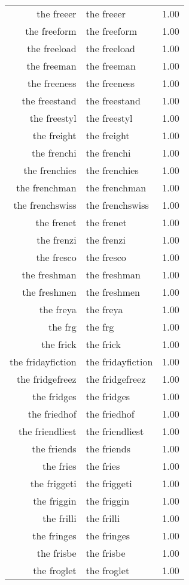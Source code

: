 \begin{table}[ht]
\begin{tabular}{rlr}
  the freeer & the freeer & 1.00 \\ 
  the freeform & the freeform & 1.00 \\ 
  the freeload & the freeload & 1.00 \\ 
  the freeman & the freeman & 1.00 \\ 
  the freeness & the freeness & 1.00 \\ 
  the freestand & the freestand & 1.00 \\ 
  the freestyl & the freestyl & 1.00 \\ 
  the freight & the freight & 1.00 \\ 
  the frenchi & the frenchi & 1.00 \\ 
  the frenchies & the frenchies & 1.00 \\ 
  the frenchman & the frenchman & 1.00 \\ 
  the frenchswiss & the frenchswiss & 1.00 \\ 
  the frenet & the frenet & 1.00 \\ 
  the frenzi & the frenzi & 1.00 \\ 
  the fresco & the fresco & 1.00 \\ 
  the freshman & the freshman & 1.00 \\ 
  the freshmen & the freshmen & 1.00 \\ 
  the freya & the freya & 1.00 \\ 
  the frg & the frg & 1.00 \\ 
  the frick & the frick & 1.00 \\ 
  the fridayfiction & the fridayfiction & 1.00 \\ 
  the fridgefreez & the fridgefreez & 1.00 \\ 
  the fridges & the fridges & 1.00 \\ 
  the friedhof & the friedhof & 1.00 \\ 
  the friendliest & the friendliest & 1.00 \\ 
  the friends & the friends & 1.00 \\ 
  the fries & the fries & 1.00 \\ 
  the friggeti & the friggeti & 1.00 \\ 
  the friggin & the friggin & 1.00 \\ 
  the frilli & the frilli & 1.00 \\ 
  the fringes & the fringes & 1.00 \\ 
  the frisbe & the frisbe & 1.00 \\ 
  the froglet & the froglet & 1.00 \\ 

\end{tabular}
\end{table}
